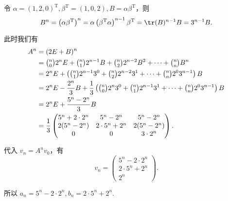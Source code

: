 \begin{exercise}
\begin{exgroup}
\begin{answer}
            令 $\alpha = (1, 2, 0)^\mathrm{T}, \beta^\mathrm{T} = (1, 0, 2), B=\alpha \beta^\mathrm{T}$，则
            \[
                B^n = \left( \alpha \beta^\mathrm{T} \right)^n = \alpha \left( \beta^\mathrm{T} \alpha \right)^{n-1} \beta^\mathrm{T} = \tr(B)^{n-1} B = 3^{n-1} B.
            \]

            此时我们有
            \begin{align*}
                A^n &= (2E + B)^n \\
                    &= \tbinom{n}{0} 2^n E + \tbinom{n}{1} 2^{n-1} B + \tbinom{n}{2} 2^{n-2} B^2 + \cdots + \tbinom{n}{n} B^n \\
                    &= 2^n E + \left(\tbinom{n}{1} 2^{n-1} 3^0 + \tbinom{n}{2} 2^{n-2} 3^1 + \cdots + \tbinom{n}{n} 2^0 3^{n-1} \right) B \\
                    &= 2^n E - \frac{2^n}{3} B + \frac{1}{3} \left(\tbinom{n}{0} 2^n 3^0 + \tbinom{n}{1} 2^{n-1} 3^1 + \cdots + \tbinom{n}{n} 2^0 3^{n-1} \right) B \\
                    &= 2^n E + \frac{5^n - 2^n}{3} B \\
                    &= \frac{1}{3} \begin{pmatrix}
                        5^n + 2 \cdot 2^n & 5^n - 2^n         & 5^n - 2^n    \\
                        2(5^n - 2^n)      & 2 \cdot 5^n + 2^n & 2(5^n - 2^n) \\
                        0                 & 0                 & 3 \cdot 2^n
                    \end{pmatrix}.
            \end{align*}

            代入 $v_n = A^n v_0$，有
            \[
                v_n = \begin{pmatrix}
                    5^n - 2 \cdot 2^n \\
                    2 \cdot 5^n + 2^n \\
                    2^n
                \end{pmatrix}.
            \]

            所以 $a_n = 5^n - 2 \cdot 2^n, b_n = 2 \cdot 5^n + 2^n$.

        \end{answer}


\end{exgroup}
\end{exercise}
